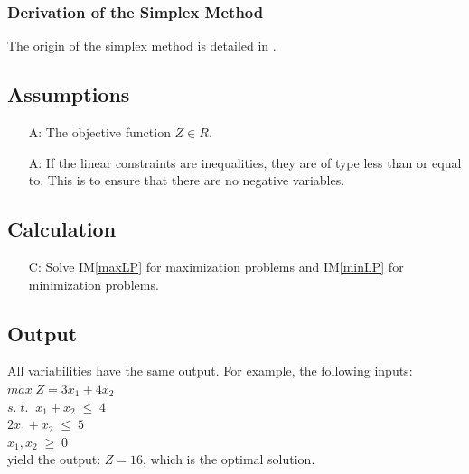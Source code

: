 \documentclass[12pt]{article}
\newcounter{assumpnum} %
\newcounter{calcnum} %
\newcommand{\iref}[1]{IM\ref{#1}}
\newcounter{lcnum} %
\begin{document}

\subsubsection*{Derivation of the Simplex Method}{
	The origin of the simplex method is detailed in \cite{simplex-origin}. 
}

\subsection{Assumptions} \label{Assumptions}

\begin{itemize}
	\item[A\refstepcounter{assumpnum}\theassumpnum \label{A_objFunSpace}:] The 
	objective function $Z \in R$.
	
	\item[A\refstepcounter{assumpnum}\theassumpnum \label{A_inequalities}:] If 
	the linear constraints are inequalities, they are of type less than or 
	equal to. This is to ensure that there are no negative variables.
\end{itemize}

\subsection{Calculation} \label{sec_Calculation}

\begin{itemize}
	\item[C\refstepcounter{calcnum}\thecalcnum \label{calculation}:] Solve 
	\iref{maxLP} for maximization problems and \iref{minLP} for minimization 
	problems.
\end{itemize}


\subsection{Output} \label{sec_Output}

All variabilities have the same output. For example, the following inputs:\\
$max\;Z = 3x_1 + 4x_2$\\ \hspace{10mm}
\indent $s.\;t.\;\;x_1 + x_2\;\leq\;4$\\
\indent \indent $2x_1 + x_2\;\leq\;5$\\
\indent \indent $x_1, x_2\;\geq\;0$\\
yield the output: $Z = 16$, which is the optimal solution.
\end{document}
